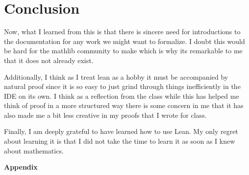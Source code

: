 \documentclass[11pt]{article}
\begin{document}
\section{Conclusion}

Now, what I learned from this is that there is sincere need for introductions to the documentation for any work we might want to formalize. I doubt this would be hard for the mathlib community to make which is why its remarkable to me that it does not already exist. 

Additionally, I think as I treat lean as a hobby it must be accompanied by natural proof since it is so easy to just grind through things inefficiently in the IDE on its own. I think as a reflection from the class while this has helped me think of proof in a more structured way there is some concern in me that it has also made me a bit less creative in my proofs that I wrote for class. 

Finally, I am deeply grateful to have learned how to use Lean. My only regret about learning it is that I did not take the time to learn it as soon as I knew about mathematics.

\newpage

\textbf{Appendix}
\end{document}
